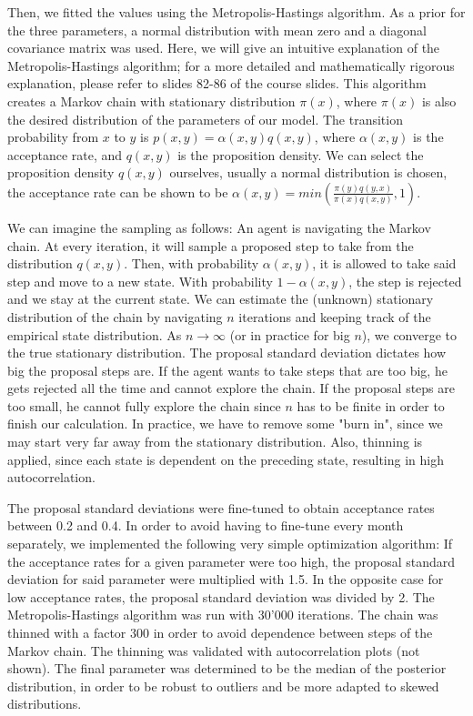 \documentclass[10pt,conference,compsocconf]{IEEEtran}
\begin{document}
\par
Then, we fitted the values using the Metropolis-Hastings algorithm. As a prior for the three parameters, a normal distribution with mean zero and a diagonal covariance matrix was used.
Here, we will give an intuitive explanation of the Metropolis-Hastings algorithm; for a more detailed and mathematically rigorous explanation, please refer to slides 82-86 of the course slides.
This algorithm creates a Markov chain with stationary distribution $\pi(x)$, where $\pi(x)$ is also the desired distribution of the parameters of our model. The transition probability from $x$ to $y$ is $p(x,y)=\alpha(x,y) q(x,y)$, where $\alpha(x,y)$ is the acceptance rate, and $q(x,y)$ is the proposition density. We can select the proposition density $q(x,y)$ ourselves, usually a normal distribution is chosen, the acceptance rate can be shown to be $\alpha(x,y)=min(\frac{\pi(y) q(y,x)}{\pi(x) q(x,y)},1)$.
\par
We can imagine the sampling as follows: An agent is navigating the Markov chain. At every iteration, it will sample a proposed step to take from the distribution $q(x,y)$. Then, with probability $\alpha(x,y)$, it is allowed to take said step and move to a new state. With probability $1-\alpha(x,y)$, the step is rejected and we stay at the current state. We can estimate the (unknown) stationary distribution of the chain by navigating $n$ iterations and keeping track of the empirical state distribution. As $n \to \infty$ (or in practice for big $n$), we converge to the true stationary distribution. The proposal standard deviation dictates how big the proposal steps are. If the agent wants to take steps that are too big, he gets rejected all the time and cannot explore the chain. If the proposal steps are too small, he cannot fully explore the chain since $n$ has to be finite in order to finish our calculation. In practice, we have to remove some "burn in", since we may start very far away from the stationary distribution. Also, thinning is applied, since each state is dependent on the preceding state, resulting in high autocorrelation. 
\par
The proposal standard deviations were fine-tuned to obtain acceptance rates between 0.2 and 0.4. In order to avoid having to fine-tune every month separately, we implemented the following very simple optimization algorithm: If the acceptance rates for a given parameter were too high, the proposal standard deviation for said parameter were multiplied with 1.5. In the opposite case for low acceptance rates, the proposal standard deviation was divided by 2. The Metropolis-Hastings algorithm was run with 30'000 iterations. The chain was thinned with a factor 300 in order to avoid dependence between steps of the Markov chain. The thinning was validated with autocorrelation plots (not shown). The final parameter was determined to be the median of the posterior distribution, in order to be robust to outliers and be more adapted to skewed distributions. 
\par
\end{document}
